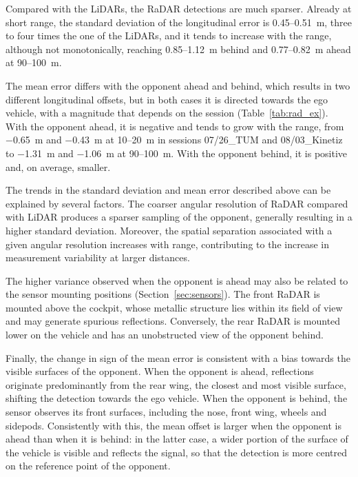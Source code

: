Compared with the LiDARs, the RaDAR detections are much sparser. Already
at short range, the standard deviation of the longitudinal error is 0.45--\SI{0.51}{m},
three to four times the one of the LiDARs, and it tends to increase with the range,
although not monotonically, reaching 0.85--\SI{1.12}{m} behind and 0.77--\SI{0.82}{m}
ahead at 90--\SI{100}{m}.

The mean error differs with the opponent ahead and behind, which results in two different
longitudinal offsets, but in both cases it is directed towards the ego vehicle, with a magnitude that depends on the session (Table~\ref{tab:rad_ex}). With the opponent
ahead, it is negative and tends to grow with the range, from \SI{-0.65}{m} and
\SI{-0.43}{m} at 10--\SI{20}{m} in sessions 07/26\_TUM and 08/03\_Kinetiz to \SI{-1.31}{m}
and \SI{-1.06}{m} at 90--\SI{100}{m}. With the opponent behind, it is positive and, on
average, smaller.

The trends in the standard deviation and mean error described above can be explained by
several factors. The coarser angular resolution of RaDAR compared with LiDAR produces a
sparser sampling of the opponent, generally resulting in a higher standard deviation.
Moreover, the spatial separation associated with a given angular resolution increases with
range, contributing to the increase in measurement variability at larger distances.

The higher variance observed when the opponent is ahead may also be related to the sensor
mounting positions (Section~\ref{sec:sensors}). The front RaDAR is mounted above the cockpit,
whose metallic structure lies within its field of view and may generate spurious reflections.
Conversely, the rear RaDAR is mounted lower on the vehicle and has an unobstructed view of
the opponent behind.

Finally, the change in sign of the mean error is consistent with a bias towards the visible
surfaces of the opponent. When the opponent is ahead, reflections originate predominantly
from the rear wing, the closest and most visible surface, shifting the detection towards the
ego vehicle. When the opponent is behind, the sensor observes its front surfaces, including
the nose, front wing, wheels and sidepods. Consistently with this, the mean offset is
larger when the opponent is ahead than when it is behind: in the latter case, a wider portion
of the surface of the vehicle is visible and reflects the signal, so that the detection is
more centred on the reference point of the opponent.

